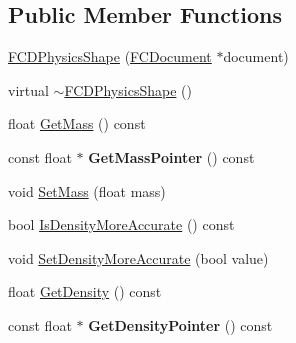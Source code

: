\subsection*{Public Member Functions}
\begin{DoxyCompactItemize}
\item 
\hyperlink{classFCDPhysicsShape_a91fd4fca45d4403ccf490a93da23228a}{FCDPhysicsShape} (\hyperlink{classFCDocument}{FCDocument} $\ast$document)
\item 
virtual \hyperlink{classFCDPhysicsShape_af21b9e41440e37775221b5a58814d3a4}{$\sim$FCDPhysicsShape} ()
\item 
float \hyperlink{classFCDPhysicsShape_a316ddb9cc0849367c9239e6e4b4285e6}{GetMass} () const 
\item 
\hypertarget{classFCDPhysicsShape_aa509fb89965dd0d0561e2a8182e57c2a}{
const float $\ast$ {\bfseries GetMassPointer} () const }
\label{classFCDPhysicsShape_aa509fb89965dd0d0561e2a8182e57c2a}

\item 
void \hyperlink{classFCDPhysicsShape_a8b5ead39b090bedf458a4535d0f8ad02}{SetMass} (float mass)
\item 
bool \hyperlink{classFCDPhysicsShape_a71b43f7a94caa7f92d56c571fc1070f9}{IsDensityMoreAccurate} () const 
\item 
void \hyperlink{classFCDPhysicsShape_a00fd8e4fccb91725643e3b5bd7c269fd}{SetDensityMoreAccurate} (bool value)
\item 
float \hyperlink{classFCDPhysicsShape_a6289d43d089627dd3a43e542cad3d5a9}{GetDensity} () const 
\item 
\hypertarget{classFCDPhysicsShape_acfd3a99968720bccb4a6a1aac21f4f5f}{
const float $\ast$ {\bfseries GetDensityPointer} () const }
\label{classFCDPhysicsShape_acfd3a99968720bccb4a6a1aac21f4f5f}


\end{DoxyCompactItemize}
